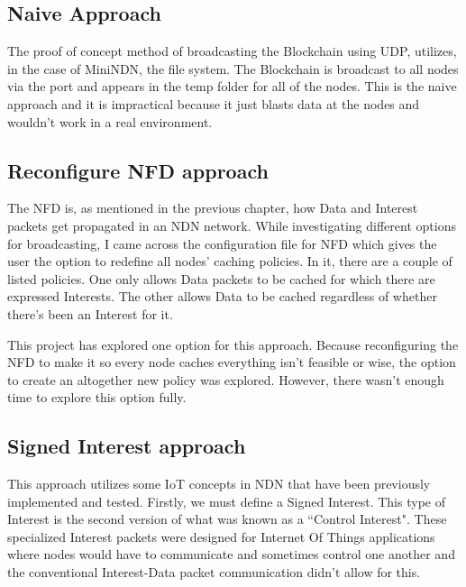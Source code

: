 \subsection{Naive Approach}
The proof of concept method of broadcasting the Blockchain using UDP, utilizes, in the case of MiniNDN, the file system. The Blockchain is broadcast to all nodes via the port and appears in the temp folder for all of the nodes. This is the naive approach and it is impractical because it just blasts data at the nodes and wouldn't work in a real environment.

\subsection{Reconfigure NFD approach}
The NFD is, as mentioned in the previous chapter, how Data and Interest packets get propagated in an NDN network. While investigating different options for broadcasting, I came across the configuration file for NFD which gives the user the option to redefine all nodes' caching policies. In it, there are a couple of listed policies. One only allows Data packets to be cached for which there are expressed Interests. The other allows Data to be cached regardless of whether there's been an Interest for it. \par
This project has explored one option for this approach. Because reconfiguring the NFD to make it so every node caches everything isn't feasible or wise, the option to create an altogether new policy was explored. However, there wasn't enough time to explore this option fully.
\subsection{Signed Interest approach}
This approach utilizes some IoT concepts in NDN that have been previously implemented and tested. Firstly, we must define a Signed Interest. This type of Interest is the second version of what was known as a ``Control Interest". These specialized Interest packets were designed for Internet Of Things applications where nodes would have to communicate and sometimes control one another and the conventional Interest-Data packet communication didn't allow for this.\par

